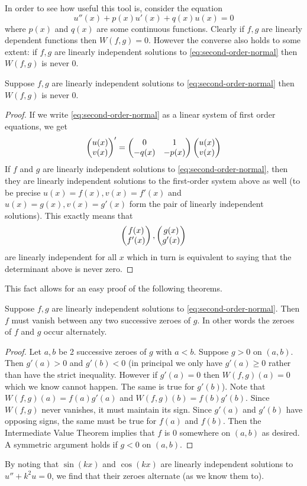 In order to see how useful this tool is, consider the equation
\begin{equation}\label{eq:second-order-normal}
    u''(x) + p(x) u'(x) + q(x) u(x) = 0 
\end{equation}
where $p(x)$ and $q(x)$ are some continuous functions. 
Clearly if $f, g$ are linearly dependent functions then $W(f, g) = 0$. However the converse also holds to some extent: if $f, g$ are linearly independent solutions to \autoref{eq:second-order-normal} then $W(f, g)$ is never 0.

\begin{lemma}
Suppose $f, g$ are linearly independent solutions to \autoref{eq:second-order-normal} then $W(f, g)$ is never 0.
\end{lemma}
\begin{proof}
If we write \autoref{eq:second-order-normal} as a linear system of first order equations, we get
\begin{align*}
    \begin{pmatrix} u(x) \\ v(x) \end{pmatrix}' = \begin{pmatrix} 0 & 1\\-q(x) & -p(x) \end{pmatrix} \begin{pmatrix} u(x) \\ v(x) \end{pmatrix}
\end{align*}
If $f$ and $g$ are linearly independent solutions to \autoref{eq:second-order-normal}, then they are linearly independent solutions to the first-order system above as well (to be precise $u(x) = f(x), v(x) = f'(x)$ and $u(x) = g(x), v(x) = g'(x)$ form the pair of linearly independent solutions).
This exactly means that
$$ \begin{pmatrix} f(x)\\f'(x) \end{pmatrix}, \begin{pmatrix} g(x) \\ g'(x) \end{pmatrix} $$
are linearly independent for all $x$ which in turn is equivalent to saying that the determinant above is never zero.
\end{proof}
This fact allows for an easy proof of the following theorems.

\begin{theorem}
Suppose $f, g$ are linearly independent solutions to \eqref{eq:second-order-normal}. Then $f$ must vanish between any two successive zeroes of $g$. In other words the zeroes of $f$ and $g$ occur alternately.
\end{theorem}
\begin{proof}
Let $a, b$ be 2 successive zeroes of $g$ with $a < b$. Suppose $g > 0$ on $(a, b)$. Then $g'(a) > 0$ and $g'(b) < 0$ (in principal we only have $g'(a) \geq 0$ rather than have the strict inequality. However if $g'(a) = 0$ then $W(f, g)(a) = 0$ which we know cannot happen. The same is true for $g'(b)$). Note that $W(f, g)(a) = f(a) g'(a)$ and $W(f, g)(b) = f(b) g'(b)$. Since $W(f, g)$ never vanishes, it must maintain its sign. Since $g'(a)$ and $g'(b)$ have opposing signs, the same must be true for $f(a)$ and $f(b)$. Then the Intermediate Value Theorem implies that $f$ is 0 somewhere on $(a, b)$ as desired. A symmetric argument holds if $g < 0$ on $(a, b)$.
\end{proof}
\begin{remark}
By noting that $\sin (kx)$ and $\cos (kx)$ are linearly independent solutions to $u'' + k^2 u = 0$, we find that their zeroes alternate (as we know them to).
\end{remark}

